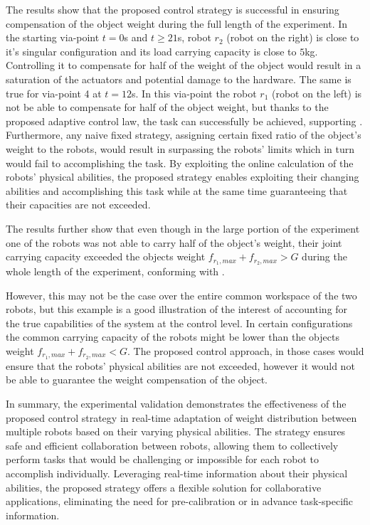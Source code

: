 The results show that the proposed control strategy is successful in ensuring compensation of the object weight during the full length of the experiment. In the starting via-point $t=0$s and $t\geq21$s, robot $r_2$ (robot on the right) is close to it's singular configuration and its load carrying capacity is close to $5$kg. Controlling it to compensate for half of the weight of the object would result in a saturation of the actuators and potential damage to the hardware. The same is true for via-point 4 at $t=12$s. In this via-point the robot $r_1$ (robot on the left) is not be able to compensate for half of the object weight, but thanks to the proposed adaptive control law, the task can successfully be achieved, supporting . 
Furthermore, any naive fixed strategy, assigning certain fixed ratio of the object's weight to the robots, would result in surpassing the robots' limits which in turn would fail to accomplishing the task. 
By exploiting the online calculation of the robots' physical abilities, the proposed strategy enables exploiting their changing abilities and accomplishing this task while at the same time guaranteeing that their capacities are not exceeded. 

The results further show that even though in the large portion of the experiment one of the robots was not able to carry half of the object's weight, their joint carrying capacity exceeded the objects weight $f_{r_1,max}+f_{r_2,max} >G$ during the whole length of the experiment, conforming with .

However, this may not be the case over the entire common workspace of the two robots, but this example is a good illustration of the interest of accounting for the true capabilities of the system at the control level.  In certain configurations the common carrying capacity of the robots might be lower than the objects weight $f_{r_1,max}+f_{r_2,max} <G$. The proposed control approach, in those cases would ensure that the robots' physical abilities are not exceeded, however it would not be able to guarantee the weight compensation of the object. 

In summary, the experimental validation demonstrates the effectiveness of the proposed control strategy in real-time adaptation of weight distribution between multiple robots based on their varying physical abilities. The strategy ensures safe and efficient collaboration between robots, allowing them to collectively perform tasks that would be challenging or impossible for each robot to accomplish individually. Leveraging real-time information about their physical abilities, the proposed strategy offers a flexible solution for collaborative applications, eliminating the need for pre-calibration or in advance task-specific information.

